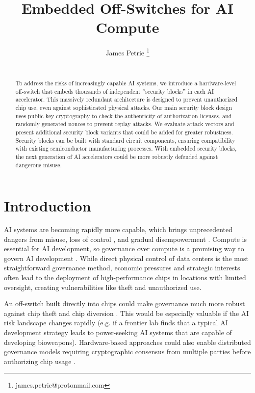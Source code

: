 \documentclass{article}
\title{Embedded Off-Switches for AI Compute}
\author{
  James Petrie  \thanks{james.petrie@protonmail.com} \\
  \\
}
\begin{document}
\maketitle

\begin{abstract}
To address the risks of increasingly capable AI systems, we introduce a hardware-level off-switch that embeds thousands of independent ``security blocks'' in each AI accelerator. This massively redundant architecture is designed to prevent unauthorized chip use, even against sophisticated physical attacks. Our main security block design uses public key cryptography to check the authenticity of authorization licenses, and randomly generated nonces to prevent replay attacks. We evaluate attack vectors and present additional security block variants that could be added for greater robustness. Security blocks can be built with standard circuit components, ensuring compatibility with existing semiconductor manufacturing processes. With embedded security blocks, the next generation of AI accelerators could be more robustly defended against dangerous misuse.
\end{abstract}


\section{Introduction}

AI systems are becoming rapidly more capable, which brings unprecedented dangers from misuse, loss of control \cite{bengio_international_2025}, and gradual disempowerment \cite{kulveit_gradual_2025}. Compute is essential for AI development, so governance over compute is a promising way to govern AI development \cite{sastry_computing_2024}. While direct physical control of data centers is the most straightforward governance method, economic pressures and strategic interests often lead to the deployment of high-performance chips in locations with limited oversight, creating vulnerabilities like theft and unauthorized use.

An off-switch built directly into chips could make governance much more robust against chip theft and chip diversion \cite{aarne_secure_2024, kulp_hardware-enabled_2024, ramiah_toward_2025}. This would be especially valuable if the AI risk landscape changes rapidly \cite{barnett_ai_2025} (e.g. if a frontier lab finds that a typical AI development strategy leads to power-seeking AI systems that are capable of developing bioweapons). Hardware-based approaches could also enable distributed governance models requiring cryptographic consensus from multiple parties before authorizing chip usage \cite{petrie_flexible_2025}.
\end{document}
